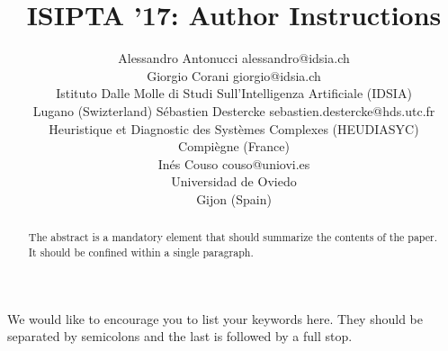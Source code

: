 \documentclass[twoside,11pt]{article}
\begin{document}
\title{ISIPTA '17: Author Instructions}
\author{\name Alessandro Antonucci \email alessandro@idsia.ch\\
\name Giorgio Corani \email giorgio@idsia.ch\\
\addr Istituto Dalle Molle di Studi Sull'Intelligenza Artificiale (IDSIA)\\
Lugano (Swizterland)
\AND
\name S\'ebastien Destercke \email sebastien.destercke@hds.utc.fr\\
\addr Heuristique et Diagnostic des Systèmes Complexes (HEUDIASYC)\\
Compi\`egne (France)\\
\AND
\name In\'es Couso \email couso@uniovi.es\\
\addr Universidad de Oviedo\\
Gijon (Spain)}
\maketitle
\begin{abstract}%
The abstract is a mandatory element that should summarize the contents of the paper. It should be confined within a single paragraph.
\end{abstract}
\begin{keywords}
We would like to encourage you to list your keywords here. They should be separated by semicolons and the last is followed by a full stop.
\end{keywords}
\end{document}
